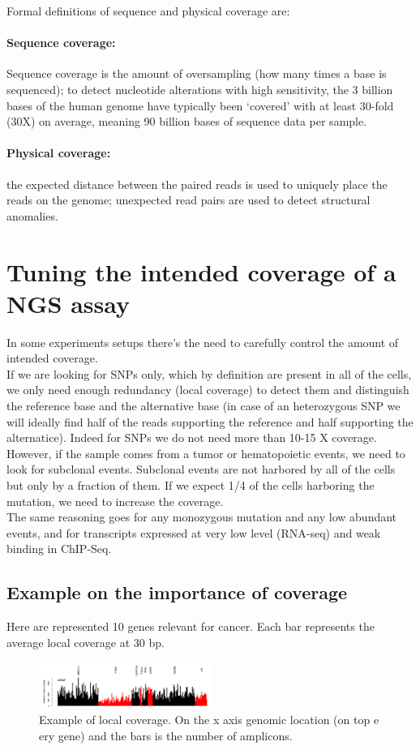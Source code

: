 Formal definitions of sequence and physical coverage are:

\paragraph*{Sequence coverage:}
	Sequence coverage is the amount of oversampling (how many times a base is sequenced); to detect nucleotide alterations with high sensitivity, the 3 billion bases of the human genome have typically been ‘covered’ with at least 30-fold (30X) on average, meaning 90 billion bases of sequence data per sample. 
	\paragraph*{Physical coverage:}
		the expected distance between the paired reads is used to uniquely place the reads on the genome; unexpected read pairs are used to detect structural anomalies.
		
		

\section{Tuning the intended coverage of a NGS assay}
In some experiments setups there's the need to carefully control the amount of intended coverage. \\
If we are looking for SNPs only, which by definition are present in all of the cells, we only need enough redundancy (local coverage) to detect them and distinguish the reference base and the alternative base (in case of an heterozygous SNP we will ideally find half of the reads supporting the reference and half supporting the alternatice). Indeed for SNPs we do not need more than 10-15 X coverage. 
\\
However, if the sample comes from a tumor or hematopoietic events, we need to look for subclonal events. Subclonal events are not harbored by all of the cells but only by a fraction of them. If we expect 1/4 of the cells harboring the mutation, we need to increase the coverage. \\
The same reasoning goes for any monozygous mutation and any low abundant events, and for  transcripts expressed at very low level (RNA-seq) and weak binding in ChIP-Seq. 

\subsection{Example on the importance of coverage}
Here are represented 10 genes relevant for cancer. Each bar represents the average local coverage at 30 bp.
\begin{figure}[htbp!]
    \centering
    \includegraphics[width=0.5\textwidth]{local_coverage.png}
    \caption{Example of local coverage. On the x axis genomic location (on top e ery gene) and the bars is the number of amplicons. }
    \label{fig:local}
\end{figure}

